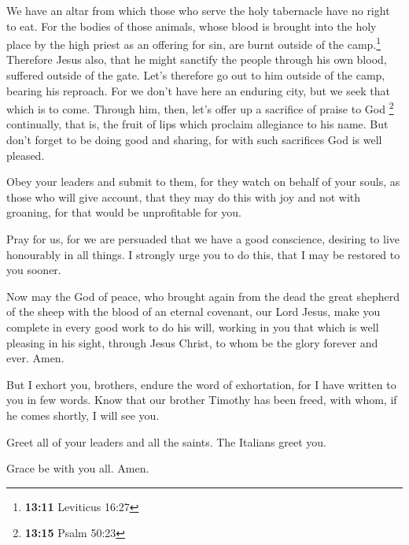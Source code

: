  We have an altar from which those who serve the holy
tabernacle have no right to eat.  For the bodies of those
animals, whose blood is brought into the holy place by the high priest
as an offering for sin, are burnt outside of the camp.\footnote{\textbf{13:11}
  Leviticus 16:27}  Therefore Jesus also, that he might
sanctify the people through his own blood, suffered outside of the gate.
 Let's therefore go out to him outside of the camp,
bearing his reproach.  For we don't have here an enduring
city, but we seek that which is to come.  Through him,
then, let's offer up a sacrifice of praise to God \footnote{\textbf{13:15}
  Psalm 50:23} continually, that is, the fruit of lips which proclaim
allegiance to his name.  But don't forget to be doing
good and sharing, for with such sacrifices God is well pleased.

 Obey your leaders and submit to them, for they watch on
behalf of your souls, as those who will give account, that they may do
this with joy and not with groaning, for that would be unprofitable for
you.

 Pray for us, for we are persuaded that we have a good
conscience, desiring to live honourably in all things.  I
strongly urge you to do this, that I may be restored to you sooner.

 Now may the God of peace, who brought again from the
dead the great shepherd of the sheep with the blood of an eternal
covenant, our Lord Jesus,  make you complete in every
good work to do his will, working in you that which is well pleasing in
his sight, through Jesus Christ, to whom be the glory forever and ever.
Amen.

 But I exhort you, brothers, endure the word of
exhortation, for I have written to you in few words. 
Know that our brother Timothy has been freed, with whom, if he comes
shortly, I will see you.

 Greet all of your leaders and all the saints. The
Italians greet you.

 Grace be with you all. Amen.
